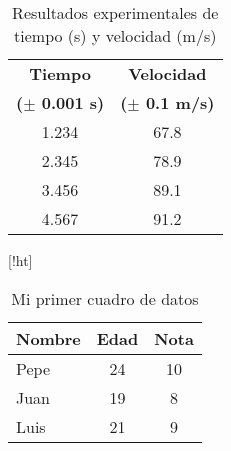 \begin{table}[!ht]
\begin{center}
\begin{tabular}{|c|c|} \hline 
\textbf{Tiempo  } & \textbf{Velocidad} \\ 
\textbf{($\pm$ 0.001 s)} & \textbf{($\pm$ 0.1 m/s)} \\ \hline \hline
1.234 &
67.8
\\
\hline

2.345 &
78.9
\\
\hline

3.456 &
89.1
\\
\hline

4.567 &
91.2
\\
\hline

\end{tabular}
\end{center}
\caption{Resultados experimentales de tiempo (s) y velocidad (m/s)}
\label{tab:1}
\end{table}

\begin{table}
\end{table}
\begin{table}{[!ht]}
 \begin{center}
  \begin{tabular}{|l|c|c|}
   \hline
   Nombre & Edad & Nota \\ \hline
   Pepe & 24 & 10 \\ \hline
   Juan & 19 & 8 \\ \hline
   Luis & 21 & 9 \\ \hline
\end{tabular}
\end{center}
\caption{Mi primer cuadro de datos}
\label{tab}
\end{table}